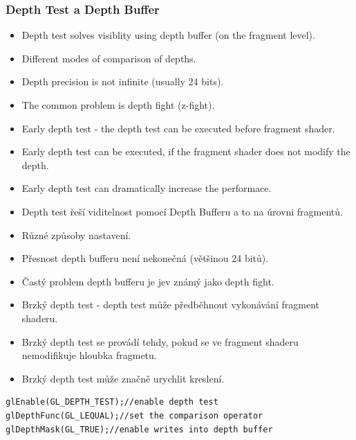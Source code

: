\begin{frame}[fragile]\frametitle{Depth Test a Depth Buffer}\scriptsize
  \begin{itemize}
  \item Depth test solves visiblity using depth buffer (on the fragment level).
  \item Different modes of comparison of depths.
  \item Depth precision is not infinite (usually 24 bits).
  \item The common problem is depth fight (z-fight).
  \item Early depth test - the depth test can be executed before fragment shader.
  \item Early depth test can be executed, if the fragment shader does not modify the depth.
  \item Early depth test can dramatically increase the performace.
  \end{itemize}
  \begin{itemize}
  \item Depth test řeší viditelnost pomocí Depth Bufferu a to na úrovni fragmentů.
  \item Různé způsoby nastavení.
  \item Přesnost depth bufferu není nekonečná (většinou 24 bitů).
  \item Častý problem depth bufferu je jev známý jako depth fight.
  \item Brzký depth test - depth test může předběhnout vykonávání fragment shaderu.
  \item Brzký depth test se provádí tehdy, pokud se ve fragment shaderu nemodifikuje hloubka fragmetu.
  \item Brzký depth test může značně urychlit kreslení.
  \end{itemize}
  {\scriptsize
\begin{verbatim}
glEnable(GL_DEPTH_TEST);//enable depth test
glDepthFunc(GL_LEQUAL);//set the comparison operator
glDepthMask(GL_TRUE);//enable writes into depth buffer
  \end{verbatim}
  }
\end{frame}

